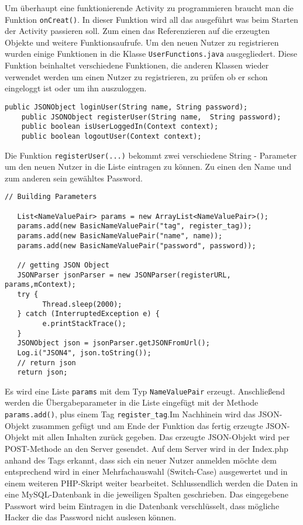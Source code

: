 Um überhaupt eine funktionierende Activity zu programmieren braucht man die Funktion \texttt{onCreat()}. In dieser Funktion wird all das ausgeführt was beim 
Starten der Activity passieren soll. Zum einen das Referenzieren auf die erzeugten Objekte und weitere Funktionsaufrufe.
Um den neuen Nutzer zu registrieren wurden einige Funktionen in die Klasse \texttt{UserFunctions.java} ausgegliedert. Diese Funktion beinhaltet verschiedene Funktionen, die anderen Klassen wieder verwendet werden um einen Nutzer zu registrieren, zu prüfen ob er schon eingeloggt ist oder um ihn auszuloggen.
\begin{lstlisting}[caption={User Functions},captionpos=b]
    public JSONObject loginUser(String name, String password);
    public JSONObject registerUser(String name,  String password);
    public boolean isUserLoggedIn(Context context);
    public boolean logoutUser(Context context);
\end{lstlisting}
Die Funktion \texttt{registerUser(...)} bekommt zwei verschiedene String - Parameter um den neuen Nutzer in die Liste eintragen zu können. Zu einen den Name und zum anderen sein gewähltes Password.
\begin{lstlisting}[caption={registerUser(...)},captionpos=b]
// Building Parameters

   List<NameValuePair> params = new ArrayList<NameValuePair>();
   params.add(new BasicNameValuePair("tag", register_tag));
   params.add(new BasicNameValuePair("name", name));
   params.add(new BasicNameValuePair("password", password));

   // getting JSON Object
   JSONParser jsonParser = new JSONParser(registerURL, params,mContext);
   try {
         Thread.sleep(2000);
   } catch (InterruptedException e) {
         e.printStackTrace();
   }
   JSONObject json = jsonParser.getJSONFromUrl();
   Log.i("JSON4", json.toString());
   // return json
   return json;
\end{lstlisting}
Es wird eine Liste \texttt{params} mit dem Typ \texttt{NameValuePair} erzeugt. Anschließend werden die Übergabeparameter in die Liste eingefügt mit der Methode \texttt{params.add()}, plus einem Tag \texttt{register\_tag}.Im Nachhinein wird das JSON-Objekt zusammen gefügt und am Ende der Funktion das fertig erzeugte JSON-Objekt mit allen Inhalten zurück gegeben.
Das erzeugte JSON-Objekt wird per POST-Methode an den Server gesendet. Auf dem Server wird in der Index.php anhand des Tags erkannt, dass sich ein neuer Nutzer anmelden möchte dem entsprechend wird in einer Mehrfachauswahl (Switch-Case) ausgewertet und in einem weiteren PHP-Skript weiter bearbeitet. Schlussendlich werden die Daten in eine MySQL-Datenbank in die jeweiligen Spalten geschrieben. Das eingegebene Passwort wird  beim Eintragen in die Datenbank verschlüsselt, dass mögliche Hacker die das Password nicht auslesen können.

